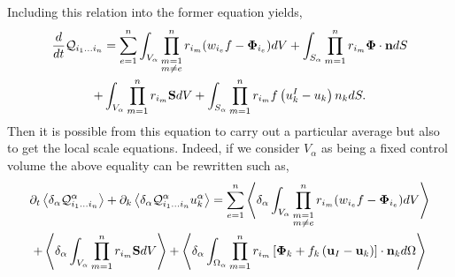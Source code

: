 Including this relation into the former equation yields, 
\begin{multline*}
    \frac{d}{d t} \mathcal{Q}_{i_1\ldots i_n}
    = \sum_{e=1}^{n} \int_{V_\alpha} \prod^{n}_{\substack{ m=1 \\   m \neq e}} r_{i_m} (w_{i_e}f  - \mathbf{\Phi}_{i_e})dV
    +\int_{S_\alpha} \prod_{m=1}^{n} r_{i_m} \mathbf{\Phi} \cdot \textbf{n}dS\\
    + \int_{V_\alpha} \prod_{m=1}^{n} r_{i_m} \textbf{S} dV
    +\int_{S_\alpha} \prod_{m=1}^{n} r_{i_m} f \left(u^I_k - u_k\right) n_k dS.
\end{multline*}
Then it is possible from this equation to carry out a particular average but also to get the local scale equations. 
Indeed, if we consider $V_\alpha$ as being a fixed control volume the above equality can be rewritten such as, 
\begin{multline*}
    \partial_t \left<\delta_\alpha \mathcal{Q}_{i_1\ldots i_n}^\alpha\right>
    + \partial_k  \left<\delta_\alpha \mathcal{Q}_{i_1\ldots i_n}^\alpha u_k^\alpha\right>
    = \sum_{e=1}^{n} \left<\delta_\alpha \int_{V_\alpha} \prod^{n}_{\substack{ m=1 \\   m \neq e}} r_{i_m} (w_{i_e}f  - \mathbf{\Phi}_{i_e})dV\right>\\
    + \left<\delta_\alpha \int_{V_\alpha} \prod_{m=1}^{n} r_{i_m} \textbf{S} dV\right>
    + \left<\delta_\alpha \int_{\Omega_\alpha} \prod_{m=1}^{n} r_{i_m} \left[
            \mathbf{\Phi}_k
            + f_k
            \left(
                \textbf{u}_I
                - \textbf{u}_k
            \right)
        \right]
        \cdot \textbf{n}_kd\Omega\right>
\end{multline*}
